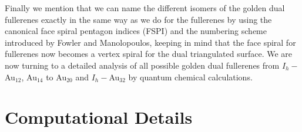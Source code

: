 Finally we mention that we can name the different isomers of the golden dual fullerenes exactly in the same way as we do for the fullerenes by using the canonical face spiral pentagon indices (FSPI) and the numbering scheme introduced by Fowler and Manolopoulos,\autocite{Fowler-atlas-2006} keeping in mind that the face spiral for fullerenes now becomes a vertex spiral for the dual triangulated surface. We are now turning to a detailed analysis of all possible golden dual fullerenes from $I_h-$Au$_{12}$, Au$_{14}$ to Au$_{20}$ and $I_h-$Au$_{32}$ by quantum chemical calculations.

\section{\label{sec:CompDet}Computational Details}

